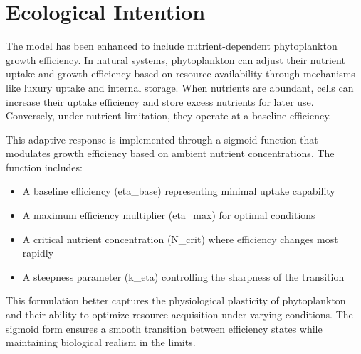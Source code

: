 \section{Ecological Intention}

The model has been enhanced to include nutrient-dependent phytoplankton growth efficiency. In natural systems, phytoplankton can adjust their nutrient uptake and growth efficiency based on resource availability through mechanisms like luxury uptake and internal storage. When nutrients are abundant, cells can increase their uptake efficiency and store excess nutrients for later use. Conversely, under nutrient limitation, they operate at a baseline efficiency.

This adaptive response is implemented through a sigmoid function that modulates growth efficiency based on ambient nutrient concentrations. The function includes:
\begin{itemize}
\item A baseline efficiency (eta\_base) representing minimal uptake capability
\item A maximum efficiency multiplier (eta\_max) for optimal conditions
\item A critical nutrient concentration (N\_crit) where efficiency changes most rapidly
\item A steepness parameter (k\_eta) controlling the sharpness of the transition
\end{itemize}

This formulation better captures the physiological plasticity of phytoplankton and their ability to optimize resource acquisition under varying conditions. The sigmoid form ensures a smooth transition between efficiency states while maintaining biological realism in the limits.
